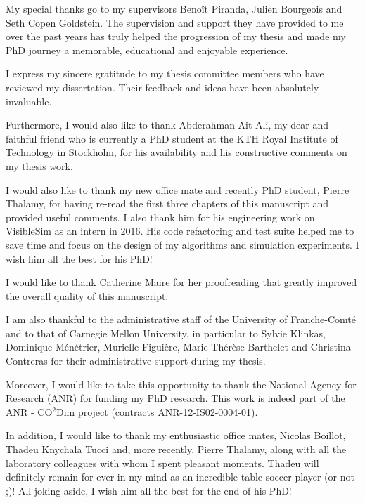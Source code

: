 \vspace*{-5em}

My special thanks go to my supervisors Beno\^it Piranda, Julien Bourgeois and Seth Copen Goldstein. The supervision and support they have provided to me over the past years has truly helped the progression of my thesis and made my PhD journey a memorable, educational and enjoyable experience.

I express my sincere gratitude to my thesis committee members who have reviewed my dissertation. Their feedback and ideas have been absolutely invaluable.

Furthermore, I would also like to thank Abderahman Ait-Ali, my dear and faithful friend who is currently a PhD student at the KTH Royal Institute of Technology in Stockholm, for his availability and his constructive comments on my thesis work.

I would also like to thank my new office mate and recently PhD student, Pierre Thalamy, for having re-read the first three chapters of this manuscript and provided useful comments. I also thank him for his engineering work on VisibleSim as an intern in 2016. His code refactoring and test suite helped me to save time and focus on the design of my algorithms and simulation experiments. I wish him all the best for his PhD!

I would like to thank Catherine Maire for her proofreading that greatly improved the overall quality of this manuscript.

I am also thankful to the administrative staff of the University of Franche-Comté and to that of Carnegie Mellon University, in particular to Sylvie Klinkas, Dominique Ménétrier, Murielle Figuière, Marie-Thérèse Barthelet and Christina Contreras for their administrative support during my thesis.

Moreover, I would like to take this opportunity to thank the National Agency for Research (ANR) for funding my PhD research. This work is indeed part of the ANR - CO$^2$Dim project (contracts ANR-12-IS02-0004-01).

In addition, I would like to thank my enthusiastic office mates, Nicolas Boillot, Thadeu Knychala Tucci and, more recently, Pierre Thalamy, along with all the laboratory colleagues with whom I spent pleasant moments. Thadeu will definitely remain for ever in my mind as an incredible table soccer player (or not ;)! All joking aside, I wish him all the best for the end of his PhD!

